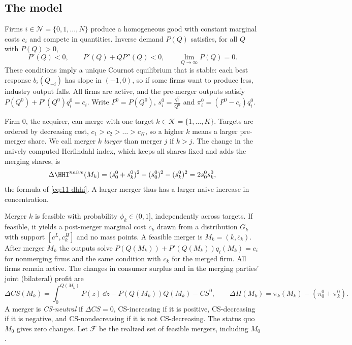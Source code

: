 \subsection{The model}\label{sec:11-nw-model}

Firms $i \in \mathcal{N} = \{0, 1, \dots, N\}$ produce a homogeneous good with constant marginal costs $c_i$ and
compete in quantities. Inverse demand $P(Q)$ satisfies, for all $Q$ with $P(Q) > 0$,
\begin{equation}\label{eq:11-nw-ass}
P'(Q) < 0, \qquad P'(Q) + QP''(Q) < 0, \qquad \lim_{Q \to \infty}P(Q) = 0 .
\end{equation}
These conditions imply a unique Cournot equilibrium that is stable: each best response $b_i(Q_{-i})$ has slope in
$(-1, 0)$, so if some firms want to produce less, industry output falls. All firms are active, and the pre-merger
outputs satisfy $P(Q^0) + P'(Q^0)q_i^0 = c_i$. Write $P^0 = P(Q^0)$, $s_i^0 = \frac{q_i^0}{Q^0}$ and $\pi_i^0 = (P^0 -
c_i)q_i^0$.

Firm 0, the acquirer, can merge with one target $k \in \mathcal{K} = \{1, \dots, K\}$. Targets are ordered by decreasing
cost, $c_1 > c_2 > \dots > c_K$, so a higher $k$ means a larger pre-merger share. We call merger $k$ \emph{larger}
than merger $j$ if $k > j$. The change in the naively computed Herfindahl index, which keeps all shares fixed and adds
the merging shares, is
\begin{equation}\label{eq:11-nw-hhi}
\Delta\HHI^{naive}(M_k) = (s_0^0 + s_k^0)^2 - (s_0^0)^2 - (s_k^0)^2 = 2 s_0^0 s_k^0 ,
\end{equation}
the formula of \eqref{eq:11-dhhi}. A larger merger thus has a larger naive increase in concentration.

Merger $k$ is feasible with probability $\phi_k \in (0, 1]$, independently across targets. If feasible, it yields a
post-merger marginal cost $\bar c_k$ drawn from a distribution $G_k$ with support $[c^L, c_k^H]$ and no mass points. A
feasible merger is $M_k = (k, \bar c_k)$. After merger $M_k$ the outputs solve $P(Q(M_k)) + P'(Q(M_k))q_i(M_k) = c_i$
for nonmerging firms and the same condition with $\bar c_k$ for the merged firm. All firms remain active. The changes in
consumer surplus and in the merging parties' joint (bilateral) profit are
\begin{equation}\label{eq:11-nw-changes}
\Delta \mathit{CS}(M_k) = \int_0^{Q(M_k)}P(z)\,\dd z - P(Q(M_k))Q(M_k) - \mathit{CS}^0,
\qquad
\Delta\Pi(M_k) = \pi_k(M_k) - (\pi_0^0 + \pi_k^0).
\end{equation}
A merger is \emph{CS-neutral} if $\Delta\mathit{CS} = 0$, CS-increasing if it is positive, CS-decreasing if it is
negative, and CS-nondecreasing if it is not CS-decreasing. The status quo $M_0$ gives zero changes. Let $\mathcal{F}$
be the realized set of feasible mergers, including $M_0$.

